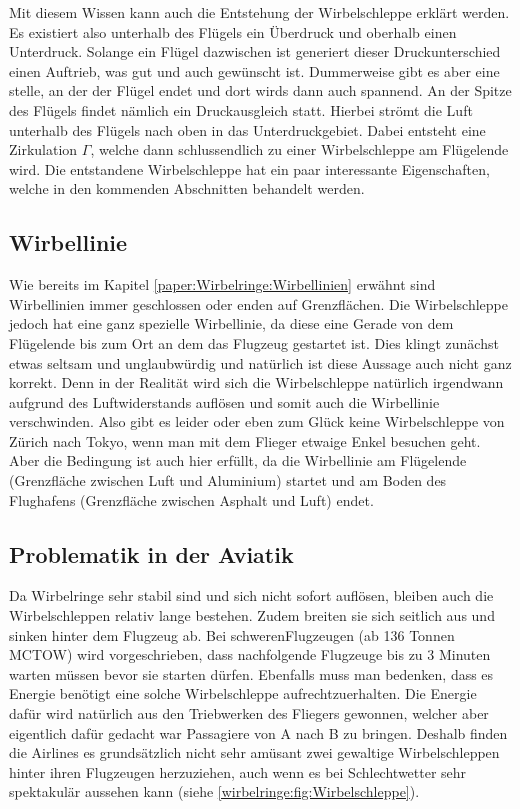 Mit diesem Wissen kann auch die Entstehung der Wirbelschleppe erklärt werden. 
Es existiert also unterhalb des Flügels ein Überdruck und oberhalb einen Unterdruck.
Solange ein Flügel dazwischen ist generiert dieser Druckunterschied einen Auftrieb, was gut und auch gewünscht ist.
Dummerweise gibt es aber eine stelle, an der der Flügel endet und dort wirds dann auch spannend.
An der Spitze des Flügels findet nämlich ein Druckausgleich statt.
Hierbei strömt die Luft unterhalb des Flügels nach oben in das Unterdruckgebiet. 
Dabei entsteht eine Zirkulation $\Gamma$, welche dann schlussendlich zu einer Wirbelschleppe am Flügelende wird.
Die entstandene Wirbelschleppe hat ein paar interessante Eigenschaften, welche in den kommenden Abschnitten behandelt werden.

\subsection{Wirbellinie}
Wie bereits im Kapitel \ref{paper:Wirbelringe:Wirbellinien} erwähnt sind Wirbellinien immer geschlossen oder enden auf Grenzflächen.
Die Wirbelschleppe jedoch hat eine ganz spezielle Wirbellinie, da diese eine Gerade von dem Flügelende bis zum Ort an dem das Flugzeug gestartet ist.
Dies klingt zunächst etwas seltsam und unglaubwürdig und natürlich ist diese Aussage auch nicht ganz korrekt.
Denn in der Realität wird sich die Wirbelschleppe natürlich irgendwann aufgrund des Luftwiderstands auflösen und somit auch die Wirbellinie verschwinden.
Also gibt es leider oder eben zum Glück keine Wirbelschleppe von Zürich nach Tokyo, wenn man mit dem Flieger etwaige Enkel besuchen geht.
Aber die Bedingung ist auch hier erfüllt, da die Wirbellinie am Flügelende (Grenzfläche zwischen Luft und Aluminium) startet und am Boden des Flughafens (Grenzfläche zwischen Asphalt und Luft) endet.

\subsection{Problematik in der Aviatik}
Da Wirbelringe sehr stabil sind und sich nicht sofort auflösen, bleiben auch die Wirbelschleppen relativ lange bestehen.
Zudem breiten sie sich seitlich aus und sinken hinter dem Flugzeug ab.
Bei \glqq schweren\grqq Flugzeugen (ab 136 Tonnen MCTOW)\cite{Wirbelringe:WakeTurbulence} wird vorgeschrieben, dass nachfolgende Flugzeuge bis zu 3 Minuten warten müssen bevor sie starten dürfen.
Ebenfalls muss man bedenken, dass es Energie benötigt eine solche Wirbelschleppe aufrechtzuerhalten.
Die Energie dafür wird natürlich aus den Triebwerken des Fliegers gewonnen, welcher aber eigentlich dafür gedacht war Passagiere von A nach B zu bringen.
Deshalb finden die Airlines es grundsätzlich nicht sehr amüsant zwei gewaltige Wirbelschleppen hinter ihren Flugzeugen herzuziehen, auch wenn es bei Schlechtwetter sehr spektakulär aussehen kann (siehe \ref{wirbelringe:fig:Wirbelschleppe}). %